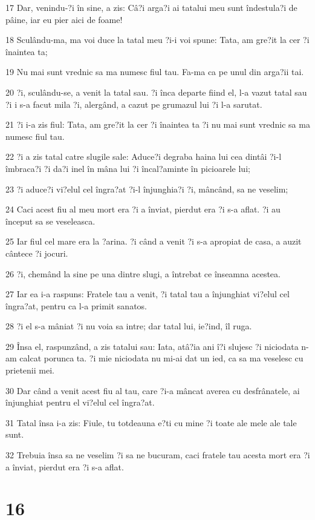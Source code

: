 \par 17 Dar, venindu-?i în sine, a zis: Câ?i arga?i ai tatalui meu sunt îndestula?i de pâine, iar eu pier aici de foame!
\par 18 Sculându-ma, ma voi duce la tatal meu ?i-i voi spune: Tata, am gre?it la cer ?i înaintea ta;
\par 19 Nu mai sunt vrednic sa ma numesc fiul tau. Fa-ma ca pe unul din arga?ii tai.
\par 20 ?i, sculându-se, a venit la tatal sau. ?i înca departe fiind el, l-a vazut tatal sau ?i i s-a facut mila ?i, alergând, a cazut pe grumazul lui ?i l-a sarutat.
\par 21 ?i i-a zis fiul: Tata, am gre?it la cer ?i înaintea ta ?i nu mai sunt vrednic sa ma numesc fiul tau.
\par 22 ?i a zis tatal catre slugile sale: Aduce?i degraba haina lui cea dintâi ?i-l îmbraca?i ?i da?i inel în mâna lui ?i încal?aminte în picioarele lui;
\par 23 ?i aduce?i vi?elul cel îngra?at ?i-l înjunghia?i ?i, mâncând, sa ne veselim;
\par 24 Caci acest fiu al meu mort era ?i a înviat, pierdut era ?i s-a aflat. ?i au început sa se veseleasca.
\par 25 Iar fiul cel mare era la ?arina. ?i când a venit ?i s-a apropiat de casa, a auzit cântece ?i jocuri.
\par 26 ?i, chemând la sine pe una dintre slugi, a întrebat ce înseamna acestea.
\par 27 Iar ea i-a raspuns: Fratele tau a venit, ?i tatal tau a înjunghiat vi?elul cel îngra?at, pentru ca l-a primit sanatos.
\par 28 ?i el s-a mâniat ?i nu voia sa intre; dar tatal lui, ie?ind, îl ruga.
\par 29 Însa el, raspunzând, a zis tatalui sau: Iata, atâ?ia ani î?i slujesc ?i niciodata n-am calcat porunca ta. ?i mie niciodata nu mi-ai dat un ied, ca sa ma veselesc cu prietenii mei.
\par 30 Dar când a venit acest fiu al tau, care ?i-a mâncat averea cu desfrânatele, ai înjunghiat pentru el vi?elul cel îngra?at.
\par 31 Tatal însa i-a zis: Fiule, tu totdeauna e?ti cu mine ?i toate ale mele ale tale sunt.
\par 32 Trebuia însa sa ne veselim ?i sa ne bucuram, caci fratele tau acesta mort era ?i a înviat, pierdut era ?i s-a aflat.

\chapter{16}

